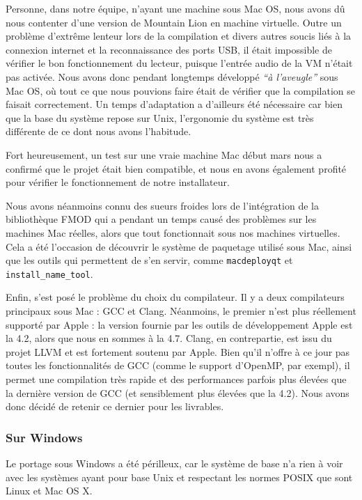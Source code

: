 Personne, dans notre équipe, n'ayant une machine sous Mac OS, nous avons dû nous contenter d'une version de Mountain Lion en machine virtuelle. Outre un problème d'extrême lenteur lors de la compilation et divers autres soucis liés à la connexion internet et la reconnaissance des ports USB, il était impossible de vérifier le bon fonctionnement du lecteur, puisque l'entrée audio de la VM n'était pas activée. Nous avons donc pendant longtemps développé \textit{``à l'aveugle''} sous Mac OS, où tout ce que nous pouvions faire était de vérifier que la compilation se faisait correctement.
Un temps d'adaptation a d'ailleurs été nécessaire car bien que la base du système repose sur Unix, l'ergonomie du système est très différente
de ce dont nous avons l'habitude.

Fort heureusement, un test sur une vraie machine Mac début mars nous a confirmé que le projet était bien compatible, et nous en avons également profité pour vérifier le fonctionnement de notre installateur.

Nous avons néanmoins connu des sueurs froides lors de l'intégration de la bibliothèque FMOD qui a pendant un temps causé des
problèmes sur les machines Mac réelles, alors que tout fonctionnait sous nos machines virtuelles. Cela a été l'occasion de découvrir
le système de paquetage utilisé sous Mac, ainsi que les outils qui permettent de s'en servir, comme \texttt{macdeployqt} et \texttt{install\_name\_tool}.

Enfin, s'est posé le problème du choix du compilateur. Il y a deux compilateurs principaux sous Mac : \ac{GCC} et Clang.
Néanmoins, le premier n'est plus réellement supporté par Apple : la version fournie par les outils de développement Apple est la 4.2,
alors que nous en sommes à la 4.7. Clang, en contrepartie, est issu du projet LLVM et est fortement soutenu par Apple.
Bien qu'il n'offre à ce jour pas toutes les fonctionnalités de \ac{GCC} (comme le support d'OpenMP, par exempl), il permet une
compilation très rapide et des performances parfois plus élevées que la dernière version de \ac{GCC} (et sensiblement plus élevées que la 4.2).
Nous avons donc décidé de retenir ce dernier pour les livrables.
\subsubsection*{Sur Windows}

Le portage sous Windows a été périlleux, car le système de base n'a rien à voir avec les systèmes ayant pour base Unix et respectant
les normes POSIX que sont Linux et Mac OS X.

